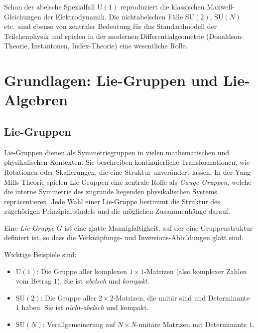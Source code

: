 \documentclass[10pt, letterpaper]{article}
\begin{document}
Schon der abelsche Spezialfall \(\mathrm{U}(1)\) reproduziert die klassischen Maxwell-Gleichungen der Elektrodynamik. Die nichtabelschen Fälle \(\mathrm{SU}(2)\), \(\mathrm{SU}(N)\) etc.\ sind ebenso von zentraler Bedeutung für das Standardmodell der Teilchenphysik und spielen in der modernen Differentialgeometrie (Donaldson-Theorie, Instantonen, Index-Theorie) eine wesentliche Rolle.

\section{Grundlagen: Lie-Gruppen und Lie-Algebren}

\subsection{Lie-Gruppen}
Lie-Gruppen dienen als Symmetriegruppen in vielen mathematischen und physikalischen Kontexten. Sie beschreiben kontinuierliche Transformationen, wie Rotationen oder Skalierungen, die eine Struktur unverändert lassen. In der Yang--Mills-Theorie spielen Lie-Gruppen eine zentrale Rolle als \emph{Gauge-Gruppen}, welche die interne Symmetrie des zugrunde liegenden physikalischen Systems repräsentieren. Jede Wahl einer Lie-Gruppe bestimmt die Struktur des zugehörigen Prinzipialbündels und die möglichen Zusammenhänge darauf.

\begin{definition}
Eine \emph{Lie-Gruppe} \(G\) ist eine glatte Mannigfaltigkeit, auf der eine Gruppenstruktur definiert ist, so dass die Verknüpfungs- und Inversions-Abbildungen glatt sind.
\end{definition}

\begin{example} Wichtige Beispiele sind:
\begin{itemize}[leftmargin=1.2em]
  \item \(\mathrm{U}(1)\): Die Gruppe aller komplexen \(1\times 1\)-Matrizen (also komplexer Zahlen vom Betrag \(1\)). Sie ist \emph{abelsch} und \emph{kompakt}.
  \item \(\mathrm{SU}(2)\): Die Gruppe aller \(2\times 2\)-Matrizen, die unitär sind und Determinante \(1\) haben. Sie ist \emph{nicht-abelsch} und kompakt.
  \item \(\mathrm{SU}(N)\): Verallgemeinerung auf \(N\times N\)-unitäre Matrizen mit Determinante \(1\).
\end{itemize}
\end{example}
\end{document}
